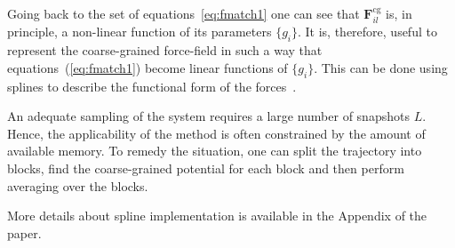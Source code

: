 Going back to the set of equations~\ref{eq:fmatch1} one can see that ${\bm F}_{il}^\text{cg}$ is, in principle, a non-linear function of its parameters $\{g_i\}$. It is, therefore, useful to represent the coarse-grained force-field in such a way that equations~(\ref{eq:fmatch1}) become linear functions of $\{g_i\}$. This can be done using splines to describe the functional form of the forces~\cite{Izvekov:2005}.

An adequate sampling of the system requires a large number of snapshots $L$. Hence, the applicability of the method is often constrained by the amount of available memory. To remedy the situation, one can split the trajectory into blocks, find the coarse-grained potential for each block and then perform averaging over the blocks. 

More details about spline implementation is available in the Appendix of the \votca paper.